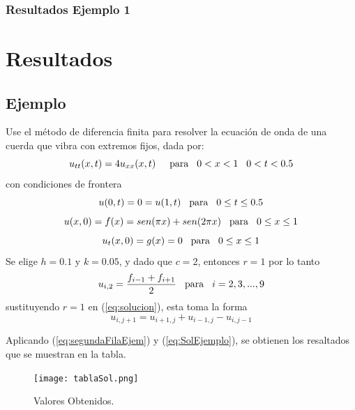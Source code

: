 \documentclass{beamer}
\begin{document}
\begin{frame}
\frametitle{Resultados Ejemplo 1}
\section{Resultados}
\subsection{Ejemplo}
Use el método de diferencia finita para resolver la ecuación de onda de una cuerda que vibra con extremos fijos, dada por:
\begin{equation*}
    u_{tt}(x,t)=4u_{xx}(x,t)\hspace{0.5cm}\text{para}\hspace{0.3cm}0<x<1\hspace{0.3cm}0<t<0.5
\end{equation*}
con condiciones de frontera
\begin{equation*}
    u(0,t)=0=u(1,t)\hspace{0.3cm}\text{para}\hspace{0.3cm}0\leq t\leq 0.5
\end{equation*}
\begin{equation*}
    u(x,0)=f(x)=sen(\pi x)+sen(2\pi x)\hspace{0.3cm}\text{para}\hspace{0.3cm}0\leq x\leq 1
\end{equation*}
\begin{equation*}
    u_t(x,0)=g(x)=0\hspace{0.3cm}\text{para}\hspace{0.3cm}0\leq x\leq 1
\end{equation*}
Se elige $h=0.1$ y $k=0.05$, y dado que $c=2$, entonces $r=1$ por lo tanto
\begin{equation}\label{eq:segundaFilaEjem}
    u_{i,2}=\frac{f_{i-1}+f_{i+1}}{2}\hspace{0.3cm}\text{para}\hspace{0.3cm}i=2,3,...,9
\end{equation}
sustituyendo $r=1$ en (\ref{eq:solucion}), esta toma la forma
\begin{equation}\label{eq:SolEjemplo}
    u_{i,j+1}=u_{i+1,j}+u_{i-1,j}-u_{i,j-1}
\end{equation}

\end{frame}


\begin{frame}
Aplicando (\ref{eq:segundaFilaEjem}) y (\ref{eq:SolEjemplo}), se obtienen los resaltados que se muestran en la tabla.
\begin{figure}[h]
\centering
\texttt{[image: tablaSol.png]}
\caption{\label{fig:Balistico}Valores Obtenidos.}
\end{figure}

\end{frame}
\end{document}
